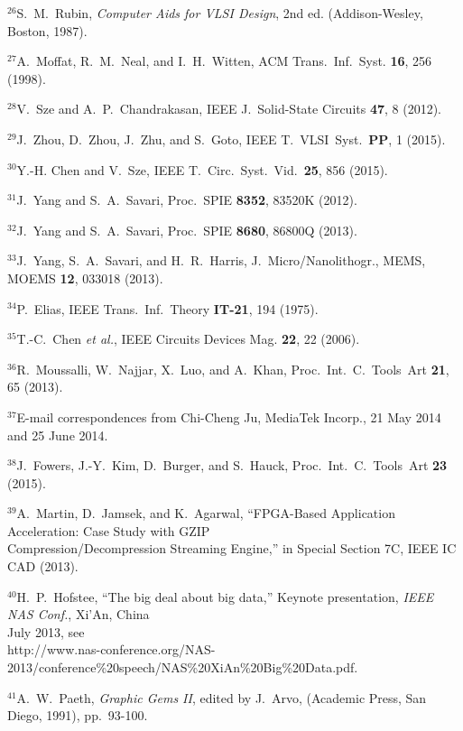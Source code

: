 \documentclass{article}
\begin{document}
\noindent $^{26}$S.~M.~Rubin, \emph{Computer Aids for VLSI Design}, 
2nd ed. (Addison-Wesley, Boston, 1987).

\noindent $^{27}$A.~Moffat, R.~M.~Neal, and I.~H.~Witten, 
ACM Trans.~Inf.~Syst. {\bf 16}, 256 (1998). 

\noindent $^{28}$V.~Sze and A.~P.~Chandrakasan, 
IEEE J.~Solid-State Circuits {\bf 47}, 8 (2012).

\noindent $^{29}$J.~Zhou, D.~Zhou, J.~Zhu, and S.~Goto, 
IEEE T.~VLSI~Syst.~{\bf PP}, 1 (2015).

\noindent $^{30}$Y.-H. Chen and V.~Sze, 
IEEE T.~Circ.~Syst.~Vid.~{\bf 25}, 856 (2015).

\noindent $^{31}$J.~Yang and S.~A.~Savari, 
Proc.~SPIE {\bf 8352}, 83520K (2012).

\noindent $^{32}$J.~Yang and S.~A.~Savari, 
Proc.~SPIE {\bf 8680}, 86800Q (2013).

\noindent $^{33}$J.~Yang, S.~A.~Savari, and H.~R.~Harris,
J.~Micro/Nanolithogr., MEMS, MOEMS {\bf 12}, 033018 (2013).

\noindent $^{34}$P.~Elias, IEEE Trans.~Inf.~Theory {\bf IT-21}, 194 (1975).

\noindent $^{35}$T.-C.~Chen {\em et al.}, IEEE Circuits Devices Mag.
{\bf 22}, 22 (2006).

\noindent $^{36}$R.~Moussalli, W.~Najjar, X.~Luo, and A.~Khan,
Proc.~Int.~C.~Tools~Art {\bf 21}, 65 (2013).

\noindent $^{37}$E-mail correspondences from Chi-Cheng Ju, MediaTek Incorp.,
21 May 2014 and 25 June 2014.

\noindent $^{38}$J.~Fowers, J.-Y.~Kim, D.~Burger, and S.~Hauck,
Proc.~Int.~C.~Tools~Art {\bf 23} (2015).

\noindent $^{39}$A.~Martin, D.~Jamsek, and K.~Agarwal, ``FPGA-Based
Application Acceleration: Case Study with GZIP \\
\indent Compression/Decompression Streaming Engine,'' in Special Section 7C, 
IEEE IC CAD (2013).

\noindent $^{40}$H.~P.~Hofstee, ``The big deal about big data,'' Keynote 
presentation, {\em IEEE NAS Conf.}, Xi'An, China \\
 July 2013, see \\
\indent http://www.nas-conference.org/NAS-2013/conference\%20speech/NAS\%20XiAn\%20Big\%20Data.pdf.

\noindent $^{41}$A.~W.~Paeth, {\em Graphic Gems II}, edited by J.~Arvo,
(Academic Press, San Diego, 1991), pp.~93-100.
\end{document}

